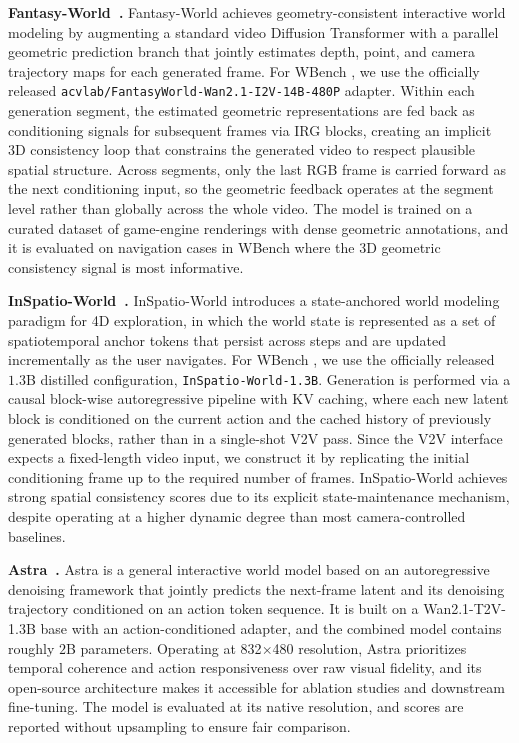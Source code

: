 \documentclass{llmxive}
\providecommand{\myparagraph}[1]{\vspace{-0.1em}\noindent\textbf{#1}\hspace{0.3em}}
\providecommand{\benchmark}{WBench }
\begin{document}
\myparagraph{Fantasy-World~\cite{fantasyworld2025}.}
Fantasy-World achieves geometry-consistent interactive world modeling by augmenting a standard video Diffusion Transformer with a parallel geometric prediction branch that jointly estimates depth, point, and camera trajectory maps for each generated frame.
For \benchmark, we use the officially released \texttt{acvlab/FantasyWorld-Wan2.1-I2V-14B-480P} adapter.
Within each generation segment, the estimated geometric representations are fed back as conditioning signals for subsequent frames via IRG blocks, creating an implicit 3D consistency loop that constrains the generated video to respect plausible spatial structure.
Across segments, only the last RGB frame is carried forward as the next conditioning input, so the geometric feedback operates at the segment level rather than globally across the whole video.
The model is trained on a curated dataset of game-engine renderings with dense geometric annotations, and it is evaluated on navigation cases in \benchmark where the 3D geometric consistency signal is most informative.

\myparagraph{InSpatio-World~\cite{inspatio2026}.}
InSpatio-World introduces a state-anchored world modeling paradigm for 4D exploration, in which the world state is represented as a set of spatiotemporal anchor tokens that persist across steps and are updated incrementally as the user navigates.
For \benchmark, we use the officially released $1.3$B distilled configuration, \texttt{InSpatio-World-1.3B}.
Generation is performed via a causal block-wise autoregressive pipeline with KV caching, where each new latent block is conditioned on the current action and the cached history of previously generated blocks, rather than in a single-shot V2V pass.
Since the V2V interface expects a fixed-length video input, we construct it by replicating the initial conditioning frame up to the required number of frames.
InSpatio-World achieves strong spatial consistency scores due to its explicit state-maintenance mechanism, despite operating at a higher dynamic degree than most camera-controlled baselines.

\myparagraph{Astra~\cite{zhu2025astra}.}
Astra is a general interactive world model based on an autoregressive denoising framework that jointly predicts the next-frame latent and its denoising trajectory conditioned on an action token sequence.
It is built on a Wan2.1-T2V-1.3B base with an action-conditioned adapter, and the combined model contains roughly $2$B parameters.
Operating at 832$\times$480 resolution, Astra prioritizes temporal coherence and action responsiveness over raw visual fidelity, and its open-source architecture makes it accessible for ablation studies and downstream fine-tuning.
The model is evaluated at its native resolution, and scores are reported without upsampling to ensure fair comparison.
\end{document}
